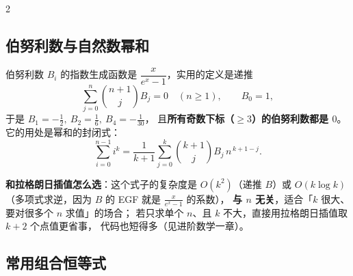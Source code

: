 \begin{multicols*}{2}
		\subsection{伯努利数与自然数幂和}

		伯努利数 $B_i$ 的指数生成函数是 $\dfrac{x}{e^x-1}$，实用的定义是递推
		\[
			\sum_{j=0}^{n}\binom{n+1}{j}B_j = 0 \quad (n \ge 1),\qquad B_0 = 1,
		\]
		于是 $B_1 = -\tfrac12,\ B_2 = \tfrac16,\ B_4 = -\tfrac1{30}$，
		且\textbf{所有奇数下标（$\ge 3$）的伯努利数都是 $0$}。它的用处是幂和的封闭式：
		\[
			\sum_{i=0}^{n-1} i^{k}
			= \frac{1}{k+1}\sum_{j=0}^{k}\binom{k+1}{j}B_j\, n^{\,k+1-j}.
		\]

		\textbf{和拉格朗日插值怎么选}：这个式子的复杂度是 $O(k^2)$（递推 $B$）或
		$O(k\log k)$（多项式求逆，因为 $B$ 的 EGF 就是 $\frac{x}{e^x-1}$ 的系数），
		\textbf{与 $n$ 无关}，适合「$k$ 很大、要对很多个 $n$ 求值」的场合；
		若只求单个 $n$、且 $k$ 不大，直接用拉格朗日插值取 $k+2$ 个点值更省事，
		代码也短得多（见进阶数学一章）。

		\subsection{常用组合恒等式}


\end{multicols*}
